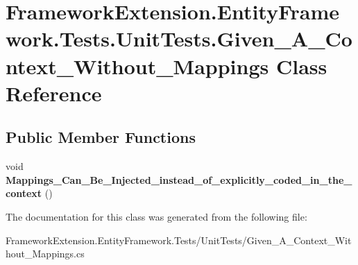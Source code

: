 \hypertarget{class_framework_extension_1_1_entity_framework_1_1_tests_1_1_unit_tests_1_1_given___a___context___without___mappings}{\section{Framework\-Extension.\-Entity\-Framework.\-Tests.\-Unit\-Tests.\-Given\-\_\-\-A\-\_\-\-Context\-\_\-\-Without\-\_\-\-Mappings Class Reference}
\label{class_framework_extension_1_1_entity_framework_1_1_tests_1_1_unit_tests_1_1_given___a___context___without___mappings}
}
\subsection*{Public Member Functions}
\begin{DoxyCompactItemize}
\item 
\hypertarget{class_framework_extension_1_1_entity_framework_1_1_tests_1_1_unit_tests_1_1_given___a___context___without___mappings_adf294b9193cd744039bbf9b5a3e5c6fa}{void {\bfseries Mappings\-\_\-\-Can\-\_\-\-Be\-\_\-\-Injected\-\_\-instead\-\_\-of\-\_\-explicitly\-\_\-coded\-\_\-in\-\_\-the\-\_\-context} ()}\label{class_framework_extension_1_1_entity_framework_1_1_tests_1_1_unit_tests_1_1_given___a___context___without___mappings_adf294b9193cd744039bbf9b5a3e5c6fa}

\end{DoxyCompactItemize}


The documentation for this class was generated from the following file\-:\begin{DoxyCompactItemize}
\item 
Framework\-Extension.\-Entity\-Framework.\-Tests/\-Unit\-Tests/Given\-\_\-\-A\-\_\-\-Context\-\_\-\-Without\-\_\-\-Mappings.\-cs\end{DoxyCompactItemize}
